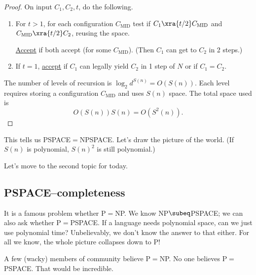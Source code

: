 \begin{proof}
On input $C_1,C_2,t$, do the following.
\begin{enumerate}
\item
For $t>1$, for each configuration $C_{\text{MID}}$ test if $C_1\xra{t/2} C_{\text{MID}}$ and $C_{\text{MID}}\xra{t/2} C_2$, reusing the space.

\ul{Accept} if both accept (for some $C_{\text{MID}}$). (Then $C_1$ can get to $C_2$ in 2 steps.)
\item
If $t=1$, \ul{accept} if $C_1$ can legally yield $C_2$ in 1 step of $N$ or if $C_1=C_2$. %
\end{enumerate}

The number of levels of recursion is $\log_2d^{S(n)}=O(S(n))$. Each level requires storing a configuration $C_{\text{MID}}$ and uses $S(n)$ space. The total space used is 
\[
O(S(n))S(n)=O(S^2(n)).
\]
\end{proof}
This tells us PSPACE$=$NPSPACE. Let's draw the picture of the world. (If $S(n)$ is polynomial, $S(n)^2$ is still polynomial.)


Let's move to the second topic for today.
\subsection{PSPACE--completeness}
It is a famous problem whether P$=$NP. We know NP$\subeq$PSPACE; we can also ask whether P$=$PSPACE. If a language needs polynomial space, can we just use polynomial time?
Unbelievably, we don't know the answer to that either. For all we know, the whole picture collapses down to P!

A few (wacky) 
members of community believe P$=$NP. No one believes P$=$PSPACE. That would be incredible. 

